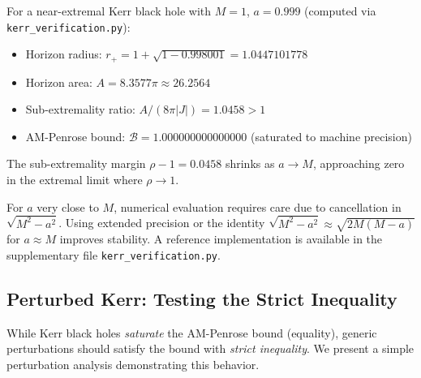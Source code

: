 \begin{example}[Near-Extremal Case: $a = 0.999M$]\label{ex:near-extremal}
For a near-extremal Kerr black hole with $M = 1$, $a = 0.999$ (computed via \texttt{kerr\_verification.py}):
\begin{itemize}
    \item Horizon radius: $r_+ = 1 + \sqrt{1 - 0.998001} = 1.0447101778$
    \item Horizon area: $A = 8.3577\pi \approx 26.2564$
    \item Sub-extremality ratio: $A/(8\pi|J|) = 1.0458 > 1$ \checkmark
    \item AM-Penrose bound: $\mathcal{B} = 1.000000000000000$ (saturated to machine precision)
\end{itemize}
The sub-extremality margin $\rho - 1 = 0.0458$ shrinks as $a \to M$, approaching zero in the extremal limit where $\rho \to 1$.
\end{example}

\begin{remark}
For $a$ very close to $M$, numerical evaluation requires care due to cancellation in $\sqrt{M^2 - a^2}$. Using extended precision or the identity $\sqrt{M^2 - a^2} \approx \sqrt{2M(M-a)}$ for $a \approx M$ improves stability. A reference implementation is available in the supplementary file \texttt{kerr\_verification.py}.
\end{remark}

\subsection{Perturbed Kerr: Testing the Strict Inequality}

While Kerr black holes \emph{saturate} the AM-Penrose bound (equality), generic perturbations should satisfy the bound with \emph{strict inequality}. We present a simple perturbation analysis demonstrating this behavior.


